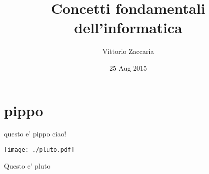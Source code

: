 \documentclass[smaller]{beamer}
\author{Vittorio Zaccaria}
\date{25 Aug 2015}
\title{Concetti fondamentali dell'informatica}
\begin{document}
\maketitle


\section{pippo}
\label{sec-1}

\begin{frame}[label=sec-1-1]{questo e' pippo}
ciao!

\texttt{[image: ./pluto.pdf]}
\end{frame}







\begin{frame}[label=sec-1-2]{Questo e' pluto}
\end{frame}
\end{document}
